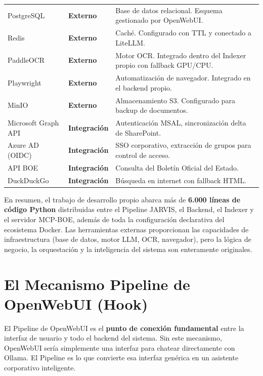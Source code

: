 \begin{table}[H]
{\begin{tabular}{llp{7cm}}
PostgreSQL                  & \textbf{Externo}       & Base de datos relacional. Esquema gestionado por OpenWebUI. \\
Redis                       & \textbf{Externo}       & Caché. Configurado con TTL y conectado a LiteLLM. \\
PaddleOCR                   & \textbf{Externo}       & Motor OCR. Integrado dentro del Indexer propio con fallback GPU/CPU. \\
Playwright                  & \textbf{Externo}       & Automatización de navegador. Integrado en el backend propio. \\
MinIO                       & \textbf{Externo}       & Almacenamiento S3. Configurado para backup de documentos. \\
\midrule
Microsoft Graph API         & \textbf{Integración}   & Autenticación MSAL, sincronización delta de SharePoint. \\
Azure AD (OIDC)             & \textbf{Integración}   & SSO corporativo, extracción de grupos para control de acceso. \\
API BOE                     & \textbf{Integración}   & Consulta del Boletín Oficial del Estado. \\
DuckDuckGo                  & \textbf{Integración}   & Búsqueda en internet con fallback HTML. \\
\bottomrule
\end{tabular}%
}
\end{table}

En resumen, el trabajo de desarrollo propio abarca más de \textbf{6.000 líneas de código Python} distribuidas entre el Pipeline JARVIS, el Backend, el Indexer y el servidor MCP-BOE, además de toda la configuración declarativa del ecosistema Docker. Las herramientas externas proporcionan las capacidades de infraestructura (base de datos, motor LLM, OCR, navegador), pero la lógica de negocio, la orquestación y la inteligencia del sistema son enteramente originales.

\section{El Mecanismo Pipeline de OpenWebUI (Hook)}
\label{sec:hook-pipeline}

El Pipeline de OpenWebUI es el \textbf{punto de conexión fundamental} entre la interfaz de usuario y todo el backend del sistema. Sin este mecanismo, OpenWebUI sería simplemente una interfaz para chatear directamente con Ollama. El Pipeline es lo que convierte esa interfaz genérica en un asistente corporativo inteligente.

